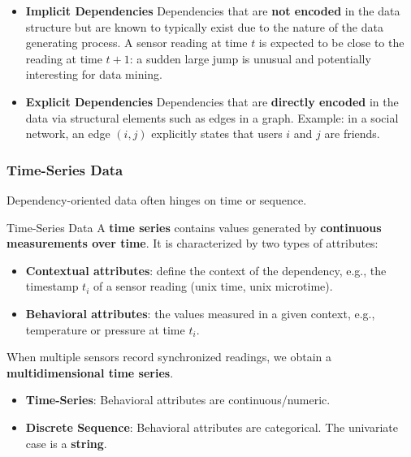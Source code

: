\documentclass[11pt]{article}
\theoremstyle{smallexample}
\begin{document}
\begin{itemize}
    \item \textbf{Implicit Dependencies}
    Dependencies that are \textbf{not encoded} in the data structure but are known
    to typically exist due to the nature of the data generating process. A sensor
    reading at time $t$ is expected to be close to the reading at time $t+1$: a
    sudden large jump is unusual and potentially interesting for data mining.

\vspace{0.3cm}
\item \textbf{Explicit Dependencies}
    Dependencies that are \textbf{directly encoded} in the data via structural
    elements such as edges in a graph. Example: in a social network, an edge
    $(i, j)$ explicitly states that users $i$ and $j$ are friends.
\end{itemize}


\subsubsection{Time-Series Data}

Dependency-oriented data often hinges on time or sequence. 

\begin{defbox}{Time-Series Data}
    A \textbf{time series} contains values generated by \textbf{continuous measurements
    over time}. It is characterized by two types of attributes:
    \begin{itemize}
        \item \textbf{Contextual attributes}: define the context of the dependency,
        e.g., the timestamp $t_i$ of a sensor reading (unix time, unix microtime).
        \pagebreak

        \item \textbf{Behavioral attributes}: the values measured in a given context,
        e.g., temperature or pressure at time $t_i$.
    \end{itemize}
    When multiple sensors record synchronized readings, we obtain a
    \textbf{multidimensional time series}.
\end{defbox}






    \begin{itemize}
        \item \textbf{Time-Series}: Behavioral attributes are continuous/numeric. 
        \item \textbf{Discrete Sequence}: Behavioral attributes are categorical. The univariate case is a \textbf{string}.
    \end{itemize}
\end{document}
